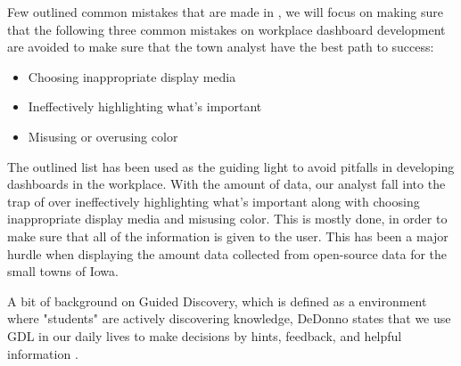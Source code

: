 \documentclass[10pt]{article}\usepackage[]{graphicx}\usepackage[]{color}
\begin{document}

Few outlined common mistakes that are made in , we will focus on making sure that the following three common mistakes on workplace dashboard development are avoided to make sure that the town analyst have the best path to success:
\begin{itemize}
\item{Choosing inappropriate display media}
\item{Ineffectively highlighting what’s important}
\item{Misusing or overusing color}
\end{itemize}

The outlined list has been used as the guiding light to avoid pitfalls in developing dashboards in the workplace. With the amount of data, our analyst fall into the trap of over ineffectively highlighting what's important along with choosing inappropriate display media and misusing color. This is mostly done, in order to make sure that all of the information is given to the user. This has been a major hurdle when displaying the amount data collected from open-source data for the small towns of Iowa.


A bit of background on Guided Discovery, which is defined as a environment where "students" are actively discovering knowledge, DeDonno states that we use GDL in our daily lives to make decisions by hints, feedback, and helpful information \cite{dedonno}.
\end{document}
